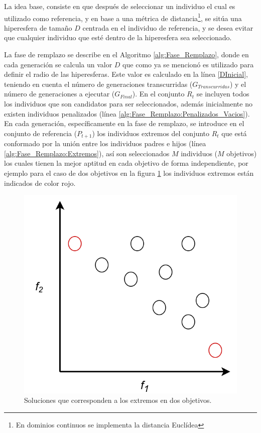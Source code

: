 La idea base, consiste en que después de seleccionar un individuo el cual es utilizado como referencia, y en base a una métrica de distancia\footnote{En dominios continuos se implementa la distancia Euclídea}, se sitúa una hiperesfera de tamaño $D$ centrada en el individuo de referencia, y se desea evitar que cualquier individuo que esté dentro de la hiperesfera sea seleccionado.

La fase de remplazo se describe en el Algoritmo \ref{alg:Fase_Remplazo}, donde en cada generación se calcula un valor $D$ que como ya se mencionó es utilizado para definir el radio de las hiperesferas. 
%
Este valor es calculado en la línea \ref{DInicial}, teniendo en cuenta el número de generaciones transcurridas ($G_{Transcurridas}$) y el número de generaciones a ejecutar ($G_{Final}$).
%
En el conjunto $R_t$ se incluyen todos los individuos que son candidatos para ser seleccionados, además inicialmente no existen individuos penalizados (línea \ref{alg:Fase_Remplazo:Penalizados_Vacios}).
%
En cada generación, específicamente en la fase de remplazo, se introduce en el conjunto de referencia ($P_{t+1}$) los individuos extremos del conjunto $R_t$ que está conformado por la unión entre los individuos padres e hijos (línea \ref{alg:Fase_Remplazo:Extremos}), así son seleccionados $M$ individuos ($M$ objetivos) los cuales tienen la mejor aptitud en cada objetivo de forma independiente, por ejemplo para el caso de dos objetivos en la figura \ref{fig:Extremos_Seleccionados} los individuos extremos están indicados de color rojo.

\begin{figure}[H]
\centering
\scriptsize
\includegraphics[scale=0.2]
{Figures_Chapter3/Extremos_Seleccionados.png}
\decoRule
\caption{Soluciones que corresponden a los extremos en dos objetivos.}
\label{fig:Extremos_Seleccionados}
\end{figure}

